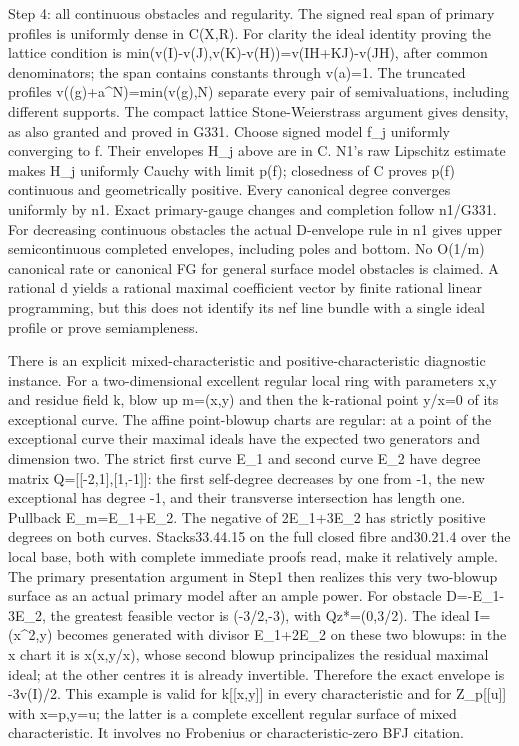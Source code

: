 Step 4: all continuous obstacles and regularity. The signed real span of primary profiles is uniformly dense in C(X,R). For clarity the ideal identity proving the lattice condition is min(v(I)-v(J),v(K)-v(H))=v(IH+KJ)-v(JH), after common denominators; the span contains constants through v(a)=1. The truncated profiles v((g)+a\textasciicircum{}N)=min(v(g),N) separate every pair of semivaluations, including different supports. The compact lattice Stone-Weierstrass argument gives density, as also granted and proved in G331. Choose signed model f\_j uniformly converging to f. Their envelopes H\_j above are in C. N1's raw Lipschitz estimate makes H\_j uniformly Cauchy with limit p(f); closedness of C proves p(f) continuous and geometrically positive. Every canonical degree converges uniformly by n1. Exact primary-gauge changes and completion follow n1/G331. For decreasing continuous obstacles the actual D-envelope rule in n1 gives upper semicontinuous completed envelopes, including poles and bottom. No O(1/m) canonical rate or canonical FG for general surface model obstacles is claimed. A rational d yields a rational maximal coefficient vector by finite rational linear programming, but this does not identify its nef line bundle with a single ideal profile or prove semiampleness.

There is an explicit mixed-characteristic and positive-characteristic diagnostic instance. For a two-dimensional excellent regular local ring with parameters x,y and residue field k, blow up m=(x,y) and then the k-rational point y/x=0 of its exceptional curve. The affine point-blowup charts are regular: at a point of the exceptional curve their maximal ideals have the expected two generators and dimension two. The strict first curve E\_1 and second curve E\_2 have degree matrix Q=[[-2,1],[1,-1]]: the first self-degree decreases by one from -1, the new exceptional has degree -1, and their transverse intersection has length one. Pullback E\_m=E\_1+E\_2. The negative of 2E\_1+3E\_2 has strictly positive degrees on both curves. Stacks33.44.15 on the full closed fibre and30.21.4 over the local base, both with complete immediate proofs read, make it relatively ample. The primary presentation argument in Step1 then realizes this very two-blowup surface as an actual primary model after an ample power. For obstacle D=-E\_1-3E\_2, the greatest feasible vector is (-3/2,-3), with Qz*=(0,3/2). The ideal I=(x\textasciicircum{}2,y) becomes generated with divisor E\_1+2E\_2 on these two blowups: in the x chart it is x(x,y/x), whose second blowup principalizes the residual maximal ideal; at the other centres it is already invertible. Therefore the exact envelope is -3v(I)/2. This example is valid for k[[x,y]] in every characteristic and for Z\_p[[u]] with x=p,y=u; the latter is a complete excellent regular surface of mixed characteristic. It involves no Frobenius or characteristic-zero BFJ citation.

